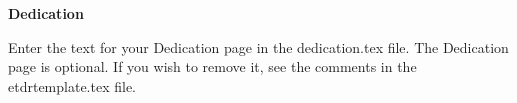 
\vspace*{0.9cm}
\begin{center}
{\bf \Huge Dedication}
\end{center}

\setlength{\baselineskip}{0.8cm}



Enter the text for your Dedication page in the dedication.tex file.
The Dedication page is optional.  If you wish to remove it, see the
comments in the etdrtemplate.tex file.
